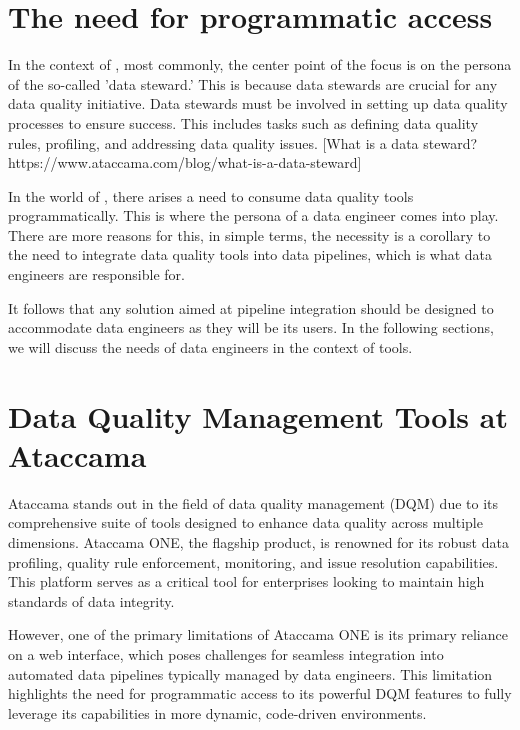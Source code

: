 \section{The need for programmatic access}

In the context of , most commonly, the center point of the focus is on the persona of the so-called 'data steward.' This is because data stewards are crucial
for any data quality initiative. Data stewards must be involved in setting up data quality processes to ensure success. This includes tasks such as defining data quality rules,
profiling, and addressing data quality issues. [What is a data steward? https://www.ataccama.com/blog/what-is-a-data-steward]

In the world of , there arises a need to consume data quality tools programmatically. This is where the persona of a data engineer comes into play. There are more reasons for this, in simple terms,
the necessity is a corollary to the need to integrate data quality tools into data pipelines, which is what data engineers are responsible for.

 It follows that any solution aimed at pipeline integration should be designed to accommodate data engineers as they will be its users. In the following sections, we will discuss the needs of data engineers in the context of  tools.

 \section{Data Quality Management Tools at Ataccama}

 Ataccama stands out in the field of data quality management (DQM) due to its comprehensive suite of tools designed to enhance data quality across multiple dimensions. Ataccama ONE, the flagship product, is renowned for its robust data profiling, quality rule enforcement, monitoring, and issue resolution capabilities. This platform serves as a critical tool for enterprises looking to maintain high standards of data integrity.
 
 However, one of the primary limitations of Ataccama ONE is its primary reliance on a web interface, which poses challenges for seamless integration into automated data pipelines typically managed by data engineers. This limitation highlights the need for programmatic access to its powerful DQM features to fully leverage its capabilities in more dynamic, code-driven environments.
 
